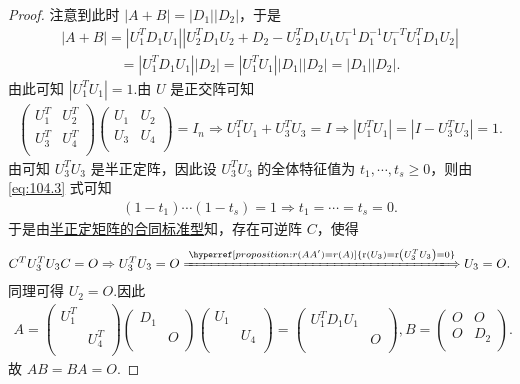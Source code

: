 \documentclass[../../main.tex]{subfiles}
\begin{document}
\begin{proof}
注意到此时 $\left| A+B \right|=\left| D_1 \right|\left| D_2 \right|$，于是
\begin{align*}
\left| A+B \right|=\left| U_{1}^{T}D_1U_1 \right|\left| U_{2}^{T}D_1U_2+D_2-U_{2}^{T}D_1U_1U_{1}^{-1}D_{1}^{-1}U_{1}^{-T}U_{1}^{T}D_1U_2 \right|
\end{align*}
\begin{align*}
=\left| U_{1}^{T}D_1U_1 \right|\left| D_2 \right|=\left| U_{1}^{T}U_1 \right|\left| D_1 \right|\left| D_2 \right|=\left| D_1 \right|\left| D_2 \right|.
\end{align*}
由此可知 $\left| U_{1}^{T}U_1 \right|=1$.由 $U$ 是正交阵可知
\begin{align}
\begin{pmatrix}
U_{1}^{T}&		U_{2}^{T}\\
U_{3}^{T}&		U_{4}^{T}\\
\end{pmatrix} \begin{pmatrix}
U_1&		U_2\\
U_3&		U_4\\
\end{pmatrix} =I_n\Rightarrow U_{1}^{T}U_1+U_{3}^{T}U_3=I\Rightarrow \left| U_{1}^{T}U_1 \right|=\left| I-U_{3}^{T}U_3 \right|=1.\label{eq:104.3}
\end{align}
由可知 $U_{3}^{T}U_3$ 是半正定阵，因此设 $U_{3}^{T}U_3$ 的全体特征值为 $t_1,\cdots ,t_s\geqslant 0$，则由 \eqref{eq:104.3} 式可知
\begin{align*}
\left( 1-t_1 \right) \cdots \left( 1-t_s \right) =1\Rightarrow t_1=\cdots =t_s=0.
\end{align*}
于是由\hyperref[theorem:正定矩阵的充要条件]{半正定矩阵的合同标准型}知，存在可逆阵 $C$，使得
\begin{align*}
C^TU_{3}^{T}U_3C=O\Rightarrow U_{3}^{T}U_3=O \xLongrightarrow{\hyperref[proposition:r(AA')=r(A)]{\mathrm{r}\left( U_3 \right) =\mathrm{r}\left( U_{3}^{T}U_3 \right) =0}} U_3=O.
\end{align*}
同理可得 $U_2=O$.因此
\begin{align*}
A=\begin{pmatrix}
U_{1}^{T}&		\\
&		U_{4}^{T}\\
\end{pmatrix} \begin{pmatrix}
D_1&		\\
&		O\\
\end{pmatrix} \begin{pmatrix}
U_1&		\\
&		U_4\\
\end{pmatrix} =\begin{pmatrix}
U_{1}^{T}D_1U_1&		\\
&		O\\
\end{pmatrix},B=\begin{pmatrix}
O&		O\\
O&		D_2\\
\end{pmatrix}.
\end{align*}
故 $AB=BA=O$.


\end{proof}
\end{document}
